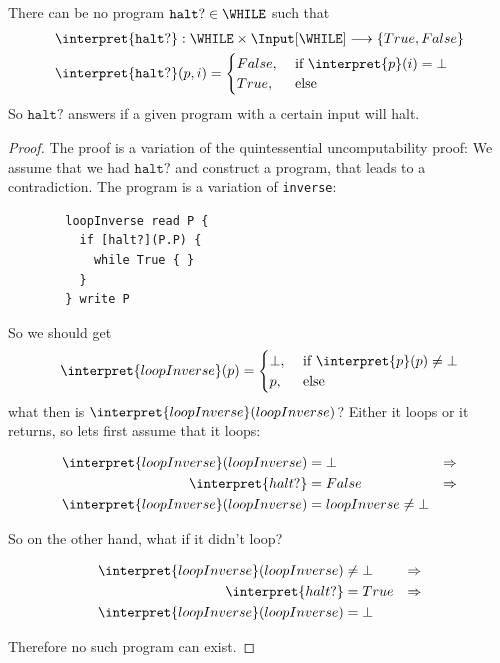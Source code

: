 \begin{theorem}
	There can be no program $\mathtt{halt?}\in \WHILE$ such that 
	\begin{align*}
		\interpret{\mathtt{halt?}}&:\WHILE\times \Input[\WHILE] \longrightarrow \{True, False\}\\
		\interpret{\mathtt{halt?}}&(p, i) =\begin{cases}
			False, &\text{ if }\interpret{p}(i)=\bot\\
			True, &\text{ else}
		\end{cases}
	\end{align*}
	So $\mathtt{halt?}$ answers if a given program with a certain input will halt.
\end{theorem}
\begin{proof}
	The proof is a variation of the quintessential uncomputability proof: We 
	assume that we had $\mathtt{halt?}$ and construct a program, that leads to a
	contradiction. The program is a variation of {\tt inverse}:

	\begin{verbatim}
		loopInverse read P {
		  if [halt?](P.P) {
		    while True { }
		  }
		} write P
	\end{verbatim}

	So we should get
	\begin{equation*}
	 \interpret{loopInverse}(p) = \begin{cases}
			\bot, &\text{ if }\interpret{p}(p) \neq \bot\\
			p,& \text{ else} 
		\end{cases}
	\end{equation*}
	what then is $\interpret{loopInverse}(loopInverse)$? Either it loops or it 
	returns, so lets first assume that it loops:

	\begin{align*}
		\interpret{loopInverse}(loopInverse) &= \bot &\Rightarrow \\ 
		\interpret{halt?} &= False &\Rightarrow \\ 
		\interpret{loopInverse}(loopInverse) &= loopInverse\neq \bot
	\end{align*}

	So on the other hand, what if it didn't loop?

	\begin{align*}
		\interpret{loopInverse}(loopInverse) &\neq\bot &\Rightarrow \\
		\interpret{halt?} &= True & \Rightarrow \\
		\interpret{loopInverse}(loopInverse) &= \bot
	\end{align*}

	Therefore no such \WHILE program can exist.
\end{proof}


